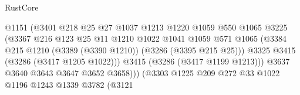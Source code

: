 \begin{lexlean}{RustCore}
\begin{coremodule}
                                            @1151
                                            (@3401
                                              @218
                                              @25
                                              @27
                                              @1037
                                              @1213
                                              @1220
                                              @1059
                                              @550
                                              @1065
                                              @3225
                                              (@3367
                                                @216
                                                @123
                                                @25
                                                @11
                                                @1210
                                                @1022
                                                @1041
                                                @1059
                                                @571
                                                @1065
                                                (@3384
                                                  @215
                                                  @1210
                                                  (@3389 (@3390 @1210))
                                                  (@3286 (@3395 @215 @25)))
                                                @3325
                                                @3415
                                                (@3286 (@3417 @1205 @1022)))
                                              @3415
                                              (@3286 (@3417 @1199 @1213)))
                                            @3637
                                            @3640
                                            @3643
                                            @3647
                                            @3652
                                            @3658)))
                                      (@3303
                                        @1225
                                        @209
                                        @272
                                        @33
                                        @1022
                                        @1196
                                        @1243
                                        @1339
                                        @3782
                                        (@3121

\end{coremodule}
\end{lexlean}

